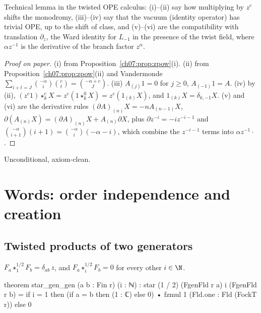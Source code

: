 \begin{physics}
Technical lemma in the twisted OPE calculus: (i)--(ii) say how multiplying by $z^c$ shifts the monodromy, (iii)--(iv) say that the vacuum (identity operator) has trivial OPE, up to the shift of class, and (v)--(vi) are the compatibility with translation $\partial_z$, the Ward identity for $L_{-1}$ in the presence of the twist field, where $\alpha z^{-1}$ is the derivative of the branch factor $z^\alpha$.
\end{physics}

\begin{proof}[Proof on paper]
(i) from Proposition~\ref{ch07:prop:zpow}(i). (ii) from Proposition~\ref{ch07:prop:zpow}(ii) and
Vandermonde $\sum_{i+t=J}\binom{-\alpha}i\binom ct = \binom{-\alpha+c}{J}$. (iii) $A_{(j)}1 = 0$
for $j\ge0$, $A_{(-1)}1 = A$. (iv) by (ii), $(z^c1)\star^c_kX = z^c(1\star^0_kX) =
z^c(1_{(k)}X)$, and $1_{(k)}X = \delta_{k,-1}X$. (v) and (vi) are the derivative rules
$(\partial A)_{(n)}X = -nA_{(n-1)}X$, $\partial(A_{(n)}X) = (\partial A)_{(n)}X+A_{(n)}\partial
X$, plus $\partial z^{-i} = -iz^{-i-1}$ and $\binom{-\alpha}{i+1}(i+1) =
\binom{-\alpha}i(-\alpha-i)$, which combine the $z^{-i-1}$ terms into $\alpha z^{-1}\cdot$.
\end{proof}

\begin{status}
Unconditional, axiom-clean.
\end{status}

\section{Words: order independence and creation}\label{ch07:sec:words}

\subsection{Twisted products of two generators}

\begin{proposition}\label{ch07:prop:stargengen}
$F_a\star^{1/2}_1F_b = \delta_{ab}\,z$, and $F_a\star^{1/2}_iF_b = 0$ for every other $i\in\N$.
\end{proposition}

\begin{leancode}
theorem star_gen_gen (a b : Fin r) (i : ℕ) :
    star (1 / 2) (FgenFld r a) i (FgenFld r b)
      = if i = 1 then (if a = b then (1 : ℂ) else 0) • fzmul 1 (Fld.one : Fld (FockT r))
        else 0
\end{leancode}

